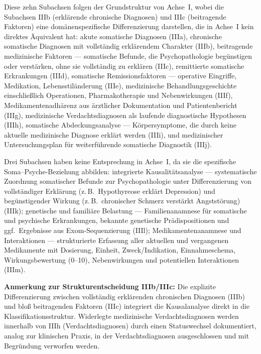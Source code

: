 \documentclass[11pt,a4paper]{article}
\begin{document}
\begin{description}[style=nextline, leftmargin=1.5cm, font=\bfseries]
\item[IIIa--IIIj: Parallele Kernstruktur] Diese zehn Subachsen folgen der Grundstruktur von Achse~I, wobei die Subachsen IIIb (erkl\"arende chronische Diagnosen) und IIIc (beitragende Faktoren) eine dom\"anenspezifische Differenzierung darstellen, die in Achse~I kein direktes \"Aquivalent hat: akute somatische Diagnosen (IIIa), chronische somatische Diagnosen mit vollst\"andig erkl\"arendem Charakter (IIIb), beitragende medizinische Faktoren --- somatische Befunde, die Psychopathologie beg\"unstigen oder verst\"arken, ohne sie vollst\"andig zu erkl\"aren (IIIc), remittierte somatische Erkrankungen (IIId), somatische Remissionsfaktoren --- operative Eingriffe, Medikation, Lebensstil\"anderung (IIIe), medizinische Behandlungsgeschichte einschlie\ss{}lich Operationen, Pharmakotherapie und Nebenwirkungen (IIIf), Medikamentenadh\"arenz aus \"arztlicher Dokumentation und Patientenbericht (IIIg), medizinische Verdachtsdiagnosen als laufende diagnostische Hypothesen (IIIh), somatische Abdeckungsanalyse --- K\"orpersymptome, die durch keine aktuelle medizinische Diagnose erkl\"art werden (IIIi), und medizinischer Untersuchungsplan f\"ur weiterf\"uhrende somatische Diagnostik (IIIj).
\item[IIIk--IIIm: Achse-III-spezifische Subachsen] Drei Subachsen haben keine Entsprechung in Achse~I, da sie die spezifische Soma--Psyche-Beziehung abbilden: integrierte Kausalit\"atsanalyse --- systematische Zuordnung somatischer Befunde zur Psychopathologie unter Differenzierung von vollst\"andiger Erkl\"arung (z.\,B.\ Hypothyreose erkl\"art Depression) und beg\"unstigender Wirkung (z.\,B.\ chronischer Schmerz verst\"arkt Angstst\"orung) (IIIk); genetische und famili\"are Belastung --- Familienanamnese f\"ur somatische und psychische Erkrankungen, bekannte genetische Pr\"adispositionen und ggf.\ Ergebnisse aus Exom-Sequenzierung (IIIl); Medikamentenanamnese und Interaktionen --- strukturierte Erfassung aller aktuellen und vergangenen Medikamente mit Dosierung, Einheit, Zweck/Indikation, Einnahmeschema, Wirkungsbewertung (0--10), Nebenwirkungen und potentiellen Interaktionen (IIIm).
\end{description}

\textbf{Anmerkung zur Strukturentscheidung IIIb/IIIc:} Die explizite Differenzierung zwischen vollst\"andig erkl\"arenden chronischen Diagnosen (IIIb) und blo\ss{} beitragenden Faktoren (IIIc) integriert die Kausalanalyse direkt in die Klassifikationsstruktur. Widerlegte medizinische Verdachtsdiagnosen werden innerhalb von IIIh (Verdachtsdiagnosen) durch einen Statuswechsel dokumentiert, analog zur klinischen Praxis, in der Verdachtsdiagnosen ausgeschlossen und mit Begr\"undung verworfen werden.
\end{document}
